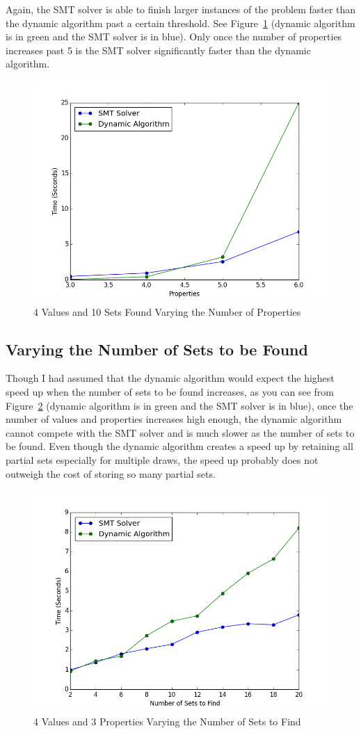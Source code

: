 \documentclass[pageno]{jpaper}
\begin{document}
Again, the SMT solver is able to finish larger instances of the problem faster than the dynamic algorithm past a certain threshold. See Figure~\ref{fig:DvSPROP} (dynamic algorithm is in green and the SMT solver is in blue). Only once the number of properties increases past 5 is the SMT solver significantly faster than the dynamic algorithm. 

\begin{figure}[htbb]

\centering
\includegraphics[width=.5\linewidth]{DvSPROP-v4p3456n10.png}
\caption{4 Values and 10 Sets Found Varying the Number of Properties}
\label{fig:DvSPROP}

\end{figure}



\subsection{Varying the Number of Sets to be Found}

Though I had assumed that the dynamic algorithm would expect the highest speed up when the number of sets to be found increases, as you can see from Figure~\ref{fig:DvSSETS} (dynamic algorithm is in green and the SMT solver is in blue), once the number of values and properties increases high enough, the dynamic algorithm cannot compete with the SMT solver and is much slower as the number of sets to be found. Even though the dynamic algorithm creates a speed up by retaining all partial sets especially for multiple draws, the speed up probably does not outweigh the cost of storing so many partial sets.

\begin{figure}[htbb]

\centering
\includegraphics[width=.5\linewidth]{DvSSETS-v4p5n2468101214161820.png}
\caption{4 Values and 3 Properties Varying the Number of Sets to Find}
\label{fig:DvSSETS}

\end{figure}
\end{document}
